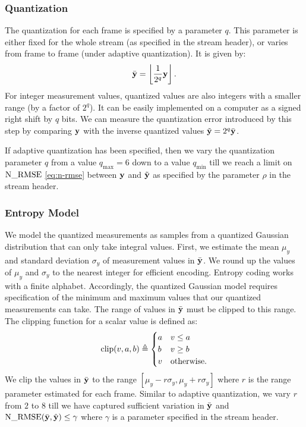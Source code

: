 \subsubsection{Quantization}
The quantization for each frame is specified by a parameter $q$.
This parameter is either fixed for the whole stream
(as specified in the stream header),
or varies from frame to frame (under adaptive quantization).
It is given by:
\begin{equation}
\label{eq-enc-quantization}
\bar{\mathbf{y}} = \left \lfloor \frac{1}{2^q} \mathbf{y} \right \rfloor.
\end{equation}
For integer measurement values, quantized values are also
integers with a smaller range (by a factor of $2^q$).
It can be easily implemented on a computer as a signed
right shift by $q$ bits.
We can measure the quantization error introduced by
this step by comparing $\mathbf{y}$ with the inverse quantized values
$\tilde{\mathbf{y}} = 2^q \bar{\mathbf{y}}$.

If adaptive quantization has been specified, then we vary
the quantization parameter $q$ from a value $q_{\max}=6$
down to a value $q_{\min}$
till we reach a limit on $\mathrm{N\_RMSE}$ \eqref{eq:n-rmse} between $\mathbf{y}$ and $\tilde{\mathbf{y}}$
as specified by the parameter $\rho$ in the stream header.

\subsubsection{Entropy Model}
We model the quantized measurements as samples from
a quantized Gaussian distribution that can only take integral values.
First, we estimate the mean $\mu_y$ and standard deviation $\sigma_y$
of measurement values in $\bar{\mathbf{y}}$.
We round up the values of $\mu_y$ and $\sigma_y$ to the nearest integer
for efficient encoding.
Entropy coding works with a finite alphabet.
Accordingly, the quantized Gaussian model
requires specification of the minimum
and maximum values that our quantized
measurements can take.
The range of values in $\bar{\mathbf{y}}$ must be clipped to this range.
The clipping function for a scalar value is defined as:
\begin{equation}
\mathrm{clip} (v, a, b) \triangleq \begin{cases}
a & v \leq a \\
b & v \geq b \\
v & \text{otherwise}.
\end{cases}
\end{equation}
We clip the values in $\bar{\mathbf{y}}$ to the range
$[\mu_y - r \sigma_y, \mu_y + r \sigma_y]$
where $r$ is the range parameter estimated for each frame.
Similar to adaptive quantization, we vary $r$ from $2$ to $8$
till we have captured sufficient variation in $\bar{\mathbf{y}}$
and $\mathrm{N\_RMSE}(\bar{\mathbf{y}}, \hat{\mathbf{y}}) \leq \gamma$
where $\gamma$ is a parameter specified in the stream header.


